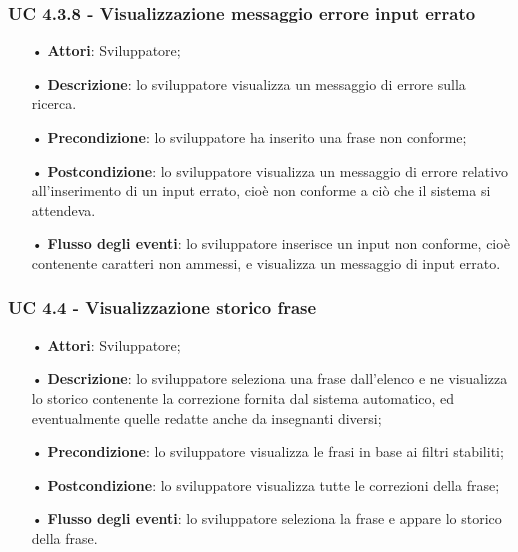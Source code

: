 \subsubsection{UC 4.3.8 - Visualizzazione messaggio errore input errato}
\begin{itemize}
	\item[•]\textbf{Attori}: Sviluppatore;
	\item[•]\textbf{Descrizione}: lo sviluppatore visualizza un messaggio di errore sulla ricerca.
	\item[•]\textbf{Precondizione}: lo sviluppatore ha inserito una frase non conforme;
	\item[•]\textbf{Postcondizione}: lo sviluppatore visualizza un messaggio di errore relativo 
	all'inserimento di un input errato, cioè non conforme a ciò che il sistema si attendeva.
	\item[•]\textbf{Flusso degli eventi}: lo sviluppatore inserisce un input non conforme, cioè contenente caratteri non ammessi, e visualizza un messaggio di input errato.
\end{itemize}

\subsubsection{UC 4.4 - Visualizzazione storico frase}
\begin{itemize}
	\item[•]\textbf{Attori}: Sviluppatore;
	\item[•]\textbf{Descrizione}: lo sviluppatore seleziona una frase dall'elenco e ne visualizza lo storico contenente la correzione fornita dal sistema automatico, ed eventualmente quelle redatte anche da insegnanti diversi;
	\item[•]\textbf{Precondizione}: lo sviluppatore visualizza le frasi in base ai filtri stabiliti;
	\item[•]\textbf{Postcondizione}: lo sviluppatore visualizza tutte le correzioni della frase;
	\item[•]\textbf{Flusso degli eventi}: lo sviluppatore seleziona la frase e appare lo storico della frase.
\end{itemize}

